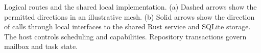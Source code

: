 Logical routes and the shared local implementation. (a) Dashed arrows show the permitted directions in an illustrative mesh. (b) Solid arrows show the direction of calls through local interfaces to the shared Rust service and SQLite storage. The host controls scheduling and capabilities. Repository transactions govern mailbox and task state. \aifigure
